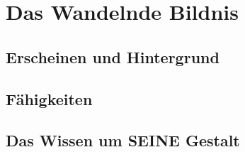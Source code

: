 \section{Das Wandelnde Bildnis}

\subsection{Erscheinen und Hintergrund}

\subsection{Fähigkeiten}

\subsection{Das Wissen um SEINE Gestalt}